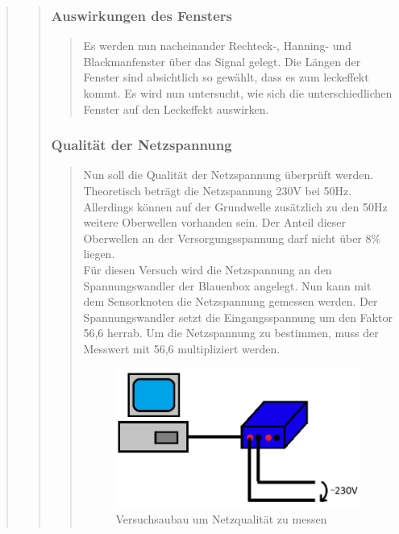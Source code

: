 \begin{quote}
\begin{quote}
\begin{quote}
		\end{quote}
		
		\subsubsection{Auswirkungen des Fensters}
		\begin{quote}
		  Es werden nun nacheinander Rechteck-, Hanning- und Blackmanfenster über das Signal gelegt. Die Längen der Fenster
		  sind absichtlich so gewählt, dass es zum leckeffekt kommt. Es wird nun untersucht, wie sich die unterschiedlichen
		  Fenster auf den Leckeffekt auswirken.		
		\end{quote}
		
		\subsubsection{Qualität der Netzspannung}
		\begin{quote}
            Nun soll die Qualität der Netzspannung überprüft werden. Theoretisch beträgt die Netzspannung 230V bei 50Hz.
            Allerdings können auf der Grundwelle zusätzlich zu den 50Hz weitere Oberwellen vorhanden sein. Der Anteil
            dieser Oberwellen an der Versorgungsspannung darf nicht über $8\%$ liegen.\\
            Für diesen Versuch wird die Netzspannung an den Spannungswandler der Blauenbox angelegt. Nun kann mit dem
            Sensorknoten die Netzspannung gemessen werden. Der Spannungswandler setzt die Eingangsspannung um den Faktor
            56,6 herrab. Um die Netzspannung zu bestimmen, muss der Messwert mit 56,6 multipliziert werden.
		
    		\begin{figure}[htb]
        		\centering
        		\includegraphics[scale=0.6, trim = 0cm 0cm 0cm 0cm,
                    clip]{./Bilder/Versuchsaufbau2}
        		\caption{Versuchsaubau um Netzqualität zu messen}
    		\end{figure}
		

\end{quote}
\end{quote}
\end{quote}
